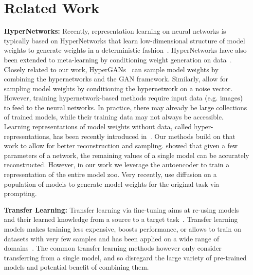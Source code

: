 \documentclass{article}
\begin{document}
\section{Related Work} 

\textbf{HyperNetworks:}
Recently, representation learning on neural networks is typically based on HyperNetworks that
learn low-dimensional structure of model weights to generate weights in a deterministic fashion~\citep{haHyperNetworks2016,bertinetto2016learning,knyazevParameterPredictionUnseen2021,zhangGraphHyperNetworksNeural2019}. HyperNetworks have also been extended to meta-learning by conditioning weight generation on data~\citep{zhmoginovHyperTransformerModelGeneration2022,requeima2019fast}. Closely related to our work, HyperGANs~\citep{ratzlaffHyperGANGenerativeModel2019} can sample model weights by combining the hypernetworks and the GAN framework. Similarly, \citep{deutschGeneratingNeuralNetworks2018} allow for sampling model weights by conditioning the hypernetwork on a noise vector. However, training hypernetwork-based methods require input data (e.g. images) to feed to the neural networks. 
In practice, there may already be large collections of trained models, while their training data may not always be accessible.
Learning representations of model weights without data, called hyper-representations, has been recently introduced in~\citep{schurholtSelfSupervisedRepresentationLearning2021}. Our methods build on that work to allow for better reconstruction and sampling.
\citep{denilPredictingParametersDeep2013} showed that given a few parameters of a network, the remaining values of a single model can be accurately reconstructed. However, in our work we leverage the autoencoder to train a representation of the entire model zoo. 
Very recently, \citep{peeblesLearningLearnGenerative2022} use diffusion on a population of models to generate model weights for the original task via prompting.

\textbf{Transfer Learning:}
Transfer learning via fine-tuning aims at re-using models and their learned knowledge from a source to a target task~\citep{yosinskiHowTransferableAre2014,chen2019closer,dhillon2019baseline,mensinkFactorsInfluenceTransfer2021,kolesnikov2020big}. 
Transfer learning models makes training less expensive, boosts performance, or allows to train on datasets with very few samples and has been applied on a wide range of domains~\citep{zhuangComprehensiveSurveyTransfer2020}. 
The common transfer learning methods however only consider transferring from a single model, and so disregard the large variety of pre-trained models and potential benefit of combining them.
\end{document}
